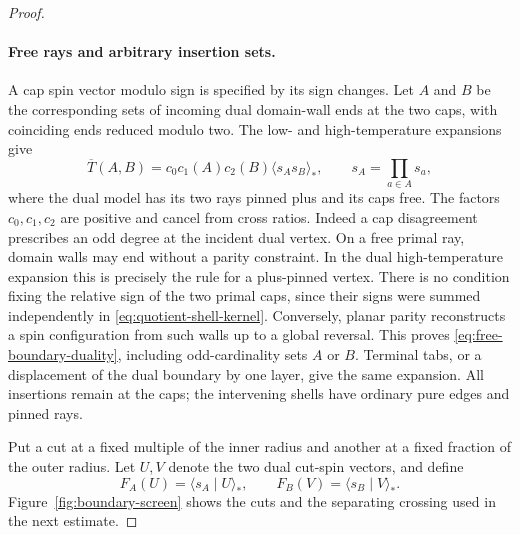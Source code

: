 \begin{proof}
\paragraph{Free rays and arbitrary insertion sets.}
A cap spin vector modulo sign is specified by its sign changes.
Let $A$ and $B$ be the corresponding sets of incoming dual domain-wall
ends at the two caps, with coinciding ends reduced modulo two. The
low- and high-temperature expansions give
\begin{equation}
 \overline T(A,B)=c_0 c_1(A)c_2(B)
                       \langle s_A s_B\rangle_*,
 \qquad s_A=\prod_{a\in A}s_a,
 \label{eq:free-boundary-duality}
\end{equation}
where the dual model has its two rays pinned plus and its caps free.
The factors $c_0,c_1,c_2$ are positive and cancel from cross ratios.
Indeed a cap disagreement prescribes an odd degree at the incident
dual vertex. On a free primal ray, domain walls may end without a
parity constraint. In the dual high-temperature expansion this is
precisely the rule for a plus-pinned vertex. There is no condition
fixing the relative sign of the two primal caps, since their signs
were summed independently in \eqref{eq:quotient-shell-kernel}.
Conversely, planar parity reconstructs a spin configuration from such
walls up to a global reversal. This proves
\eqref{eq:free-boundary-duality}, including odd-cardinality sets
$A$ or $B$. Terminal tabs, or a displacement of the dual boundary by
one layer, give the same expansion. All insertions remain at the caps;
the intervening shells have ordinary pure edges and pinned rays.

Put a cut at a fixed multiple of the inner radius and another at a
fixed fraction of the outer radius. Let $U,V$ denote the two dual
cut-spin vectors, and define
\[
 F_A(U)=\langle s_A\mid U\rangle_*,
 \qquad F_B(V)=\langle s_B\mid V\rangle_*.
\]
Figure~\ref{fig:boundary-screen} shows the cuts and the separating
crossing used in the next estimate.


\end{proof}
